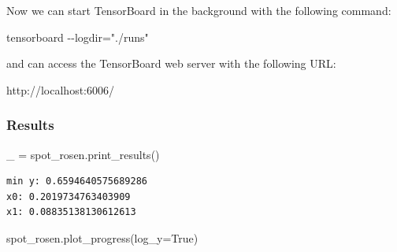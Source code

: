 \documentclass[
  letterpaper,
  DIV=11,
  numbers=noendperiod]{scrreprt}
\newenvironment{Shaded}{\begin{snugshade}}{\end{snugshade}}
\newcommand{\NormalTok}[1]{\textcolor[rgb]{0.00,0.23,0.31}{#1}}
\newcommand{\OperatorTok}[1]{\textcolor[rgb]{0.37,0.37,0.37}{#1}}
\newcommand{\VariableTok}[1]{\textcolor[rgb]{0.07,0.07,0.07}{#1}}
\begin{document}
\begin{tcolorbox}[enhanced jigsaw, coltitle=black, bottomrule=.15mm, breakable, toprule=.15mm, colframe=quarto-callout-note-color-frame, title=\textcolor{quarto-callout-note-color}{\faInfo}\hspace{0.5em}{Note}, colbacktitle=quarto-callout-note-color!10!white, opacityback=0, left=2mm, leftrule=.75mm, colback=white, rightrule=.15mm, bottomtitle=1mm, toptitle=1mm, titlerule=0mm, arc=.35mm, opacitybacktitle=0.6]

Now we can start TensorBoard in the background with the following
command:

\begin{Shaded}
\begin{Highlighting}[]
\NormalTok{tensorboard {-}{-}logdir="./runs"}
\end{Highlighting}
\end{Shaded}

and can access the TensorBoard web server with the following URL:

\begin{Shaded}
\begin{Highlighting}[]
\NormalTok{http://localhost:6006/}
\end{Highlighting}
\end{Shaded}

\end{tcolorbox}

\subsubsection{Results}\label{results-1}

\begin{Shaded}
\begin{Highlighting}[]
\NormalTok{\_ }\OperatorTok{=}\NormalTok{ spot\_rosen.print\_results()}
\end{Highlighting}
\end{Shaded}

\begin{verbatim}
min y: 0.6594640575689286
x0: 0.2019734763403909
x1: 0.08835138130612613
\end{verbatim}

\begin{Shaded}
\begin{Highlighting}[]
\NormalTok{spot\_rosen.plot\_progress(log\_y}\OperatorTok{=}\VariableTok{True}\NormalTok{)}
\end{Highlighting}
\end{Shaded}
\end{document}
